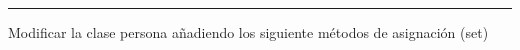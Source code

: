 \documentclass[11pt]{article}
\begin{document}
	\theoremstyle{Tema} \newtheorem{Tema}{Tema} %
	\theoremstyle{Tema} \newtheorem{serie}{Serie}              %
	\theoremstyle{Tema} \newtheorem{ejercicio}{Ejercicio}    %
	
	
	{
		\renewcommand{\headrulewidth}{1pt}
		\fancyhead[L]{ 
		}
	}
	
	{
		\renewcommand{\headrulewidth}{1 pt}
		\fancyhead[R]{
			\emph{\myDoc $-$ \myCourse} %
		}
		\fancyhead[L]{}  
		\fancyfoot[C]{}
		\fancyfoot[R]{\thepage}
	}
	
	\date{}
	\setlength{\headheight}{0.65 in} %
	
	\pagestyle{allStyle}
	
	\thispagestyle{firststyle}
	\begin{center}
		\LARGE
		\textsc{\myDoc}\\\normalsize %
		\medskip
		\hrule height 1pt
	\end{center}
	
	
	\begin{problem}
	Modificar la clase persona añadiendo los siguiente métodos
	de asignación (set)
	\end{problem}
\end{document}
